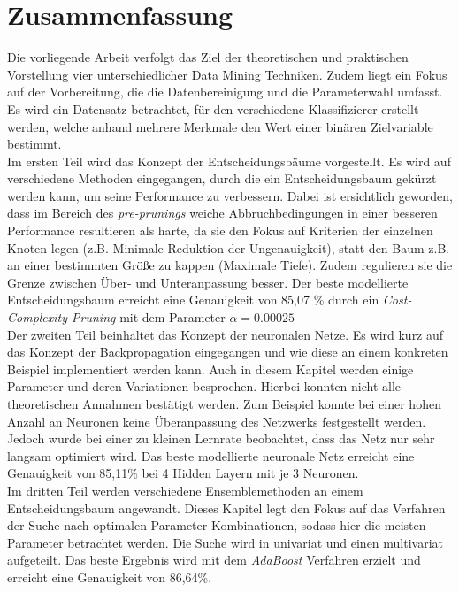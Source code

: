\pagebreak
\section*{Zusammenfassung}
Die vorliegende Arbeit verfolgt das Ziel der theoretischen und praktischen Vorstellung vier unterschiedlicher Data Mining Techniken. Zudem liegt ein Fokus auf der Vorbereitung, die die Datenbereinigung und die Parameterwahl umfasst. Es wird ein Datensatz betrachtet, für den verschiedene Klassifizierer erstellt werden, welche anhand mehrere Merkmale den Wert einer binären Zielvariable bestimmt.\\
\noindent \hspace*{7mm}
Im ersten Teil wird das Konzept der Entscheidungsbäume vorgestellt. Es wird auf verschiedene Methoden eingegangen, durch die ein Entscheidungsbaum gekürzt werden kann, um seine Performance zu verbessern. Dabei ist ersichtlich geworden, dass im Bereich des \emph{pre-prunings} weiche Abbruchbedingungen in einer besseren Performance resultieren als harte, da sie den Fokus auf Kriterien der einzelnen Knoten legen (z.B. Minimale Reduktion der Ungenauigkeit), statt den Baum z.B. an einer bestimmten Größe zu kappen (Maximale Tiefe). Zudem regulieren sie die Grenze zwischen Über- und Unteranpassung besser. Der beste modellierte Entscheidungsbaum erreicht eine Genauigkeit von 85,07 \% durch ein \emph{Cost-Complexity Pruning} mit dem Parameter $\alpha = 0.00025$\\
\noindent \hspace*{7mm}
Der zweiten Teil beinhaltet das Konzept der neuronalen Netze. Es wird kurz auf das Konzept der Backpropagation eingegangen und wie diese an einem konkreten Beispiel implementiert werden kann. Auch in diesem Kapitel werden einige Parameter und deren Variationen besprochen. Hierbei konnten nicht alle theoretischen Annahmen bestätigt werden. Zum Beispiel konnte bei einer hohen Anzahl an Neuronen keine Überanpassung des Netzwerks festgestellt werden. Jedoch wurde bei einer zu kleinen Lernrate beobachtet, dass das Netz nur sehr langsam optimiert wird. Das beste modellierte neuronale Netz erreicht eine Genauigkeit von 85,11\% bei 4 Hidden Layern mit je 3 Neuronen.\\
\noindent \hspace*{7mm}
Im dritten Teil werden verschiedene Ensemblemethoden an einem Entscheidungsbaum angewandt. Dieses Kapitel legt den Fokus auf das Verfahren der Suche nach optimalen Parameter-Kombinationen, sodass hier die meisten Parameter betrachtet werden. Die Suche wird in univariat und einen multivariat aufgeteilt. Das beste Ergebnis wird mit dem \emph{AdaBoost} Verfahren erzielt und erreicht eine Genauigkeit von 86,64\%.\\
